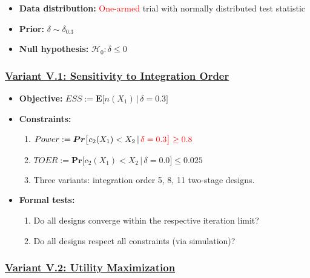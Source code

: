 \documentclass[
]{book}
\providecommand{\tightlist}{%
  \setlength{\itemsep}{0pt}\setlength{\parskip}{0pt}}
\begin{document}
\begin{itemize}
\tightlist
\item
  \textbf{Data distribution:} \textcolor{red}{One-armed} trial with normally distributed test statistic
\item
  \textbf{Prior:} \(\delta\sim\delta_{0.3}\)
\item
  \textbf{Null hypothesis:} \(\mathcal{H}_0:\delta \leq 0\)
\end{itemize}

\hypertarget{variant-v.1-sensitivity-to-integration-order}{%
\subsubsection{\texorpdfstring{\protect\hyperlink{variantV_1}{Variant V.1: Sensitivity to Integration Order}}{Variant V.1: Sensitivity to Integration Order}}\label{variant-v.1-sensitivity-to-integration-order}}

\begin{itemize}
\tightlist
\item
  \textbf{Objective:} \(ESS := \boldsymbol{E}\big[n(X_1)\,|\,\delta=0.3\big]\)
\item
  \textbf{Constraints:}

  \begin{enumerate}
  \def\labelenumi{\arabic{enumi}.}
  \tightlist
  \item
    \(Power := \boldsymbol{Pr}\big[c_2(X_1) < X_2\,|\,\color{red}{\delta=0.3}\big] \geq 0.8\)
  \item
    \(TOER := \boldsymbol{Pr}\big[c_2(X_1) < X_2\,|\,\delta=0.0\big] \leq 0.025\)
  \item
    Three variants: integration order 5, 8, 11 two-stage designs.
  \end{enumerate}
\item
  \textbf{Formal tests:}

  \begin{enumerate}
  \def\labelenumi{\arabic{enumi}.}
  \tightlist
  \item
    Do all designs converge within the respective iteration limit?
  \item
    Do all designs respect all constraints (via simulation)?
  \end{enumerate}
\end{itemize}

\hypertarget{variant-v.2-utility-maximization}{%
\subsubsection{\texorpdfstring{\protect\hyperlink{variantV_2}{Variant V.2: Utility Maximization}}{Variant V.2: Utility Maximization}}\label{variant-v.2-utility-maximization}}
\end{document}
